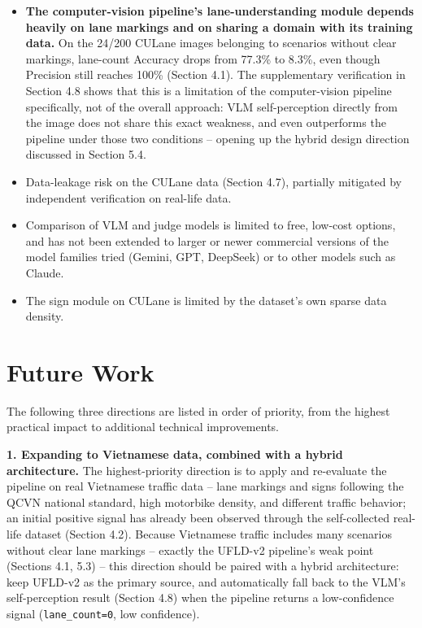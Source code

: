 \documentclass[12pt,a4paper]{report}
\begin{document}
\begin{itemize}
    \item \textbf{The computer-vision pipeline's lane-understanding module depends heavily on lane markings and on sharing a domain with its training data.} On the 24/200 CULane images belonging to scenarios without clear markings, lane-count Accuracy drops from 77.3\% to 8.3\%, even though Precision still reaches 100\% (Section 4.1). The supplementary verification in Section 4.8 shows that this is a limitation of the computer-vision pipeline specifically, not of the overall approach: VLM self-perception directly from the image does not share this exact weakness, and even outperforms the pipeline under those two conditions -- opening up the hybrid design direction discussed in Section 5.4.
    \item Data-leakage risk on the CULane data (Section 4.7), partially mitigated by independent verification on real-life data.
    \item Comparison of VLM and judge models is limited to free, low-cost options, and has not been extended to larger or newer commercial versions of the model families tried (Gemini, GPT, DeepSeek) or to other models such as Claude.
    \item The sign module on CULane is limited by the dataset's own sparse data density.
\end{itemize}

\section{Future Work}

The following three directions are listed in order of priority, from the highest practical impact to additional technical improvements.

\textbf{1. Expanding to Vietnamese data, combined with a hybrid architecture.} The highest-priority direction is to apply and re-evaluate the pipeline on real Vietnamese traffic data -- lane markings and signs following the QCVN national standard, high motorbike density, and different traffic behavior; an initial positive signal has already been observed through the self-collected real-life dataset (Section 4.2). Because Vietnamese traffic includes many scenarios without clear lane markings -- exactly the UFLD-v2 pipeline's weak point (Sections 4.1, 5.3) -- this direction should be paired with a hybrid architecture: keep UFLD-v2 as the primary source, and automatically fall back to the VLM's self-perception result (Section 4.8) when the pipeline returns a low-confidence signal (\texttt{lane\_count=0}, low confidence).
\end{document}
